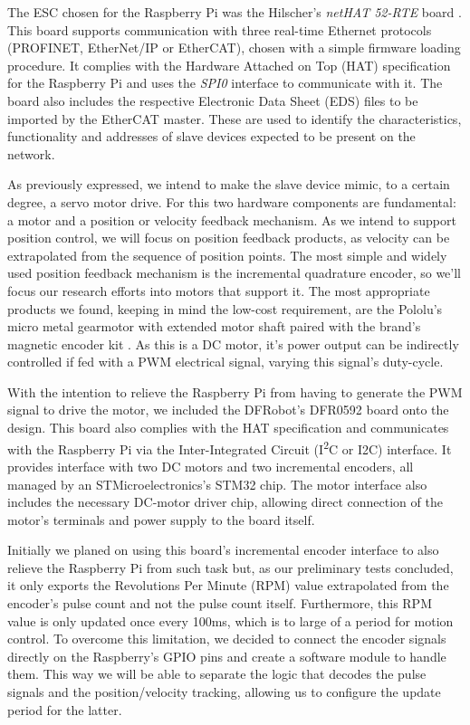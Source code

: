 The ESC chosen for the Raspberry Pi was the Hilscher's \emph{netHAT 52-RTE} board \cite{hdw:nethat-52rte}.
This board supports communication with three real-time Ethernet protocols (PROFINET, EtherNet/IP or EtherCAT), chosen with a simple firmware loading procedure.
It complies with the Hardware Attached on Top (HAT) specification for the Raspberry Pi \cite{technology:hats} and uses the \emph{SPI0} interface to communicate with it.
The board also includes the respective Electronic Data Sheet (EDS) files to be imported by the EtherCAT master.
These are used to identify the characteristics, functionality and addresses of slave devices expected to be present on the network.

As previously expressed, we intend to make the slave device mimic, to a certain degree, a servo motor drive.
For this two hardware components are fundamental: a motor and a position or velocity feedback mechanism.
As we intend to support position control, we will focus on position feedback products, as velocity can be extrapolated from the sequence of position points.
The most simple and widely used position feedback mechanism is the incremental quadrature encoder, so we'll focus our research efforts into motors that support it.
The most appropriate products we found, keeping in mind the low-cost requirement, are the Pololu's micro metal gearmotor with extended motor shaft \cite{product:pololu-micrometal-gearmotor} paired with the brand's magnetic encoder kit \cite{product:pololu-encoder-kit}.
As this is a DC motor, it's power output can be indirectly controlled if fed with a PWM electrical signal, varying this signal's duty-cycle. %

With the intention to relieve the Raspberry Pi from having to generate the PWM signal to drive the motor, we included the DFRobot's DFR0592 board onto the design.
This board also complies with the HAT specification and communicates with the Raspberry Pi via the Inter-Integrated Circuit (I\textsuperscript{2}C or I2C) interface.
It provides interface with two DC motors and two incremental encoders, all managed by an STMicroelectronics's STM32 chip.
The motor interface also includes the necessary DC-motor driver chip, allowing direct connection of the motor's terminals and power supply to the board itself.

Initially we planed on using this board's incremental encoder interface to also relieve the Raspberry Pi from such task but, as our preliminary tests concluded, it only exports the Revolutions Per Minute (RPM) value extrapolated from the encoder's pulse count and not the pulse count itself.
Furthermore, this RPM value is only updated once every 100ms, which is to large of a period for motion control.
To overcome this limitation, we decided to connect the encoder signals directly on the Raspberry's GPIO pins and create a software module to handle them.
This way we will be able to separate the logic that decodes the pulse signals and the position/velocity tracking, allowing us to configure the update period for the latter.

